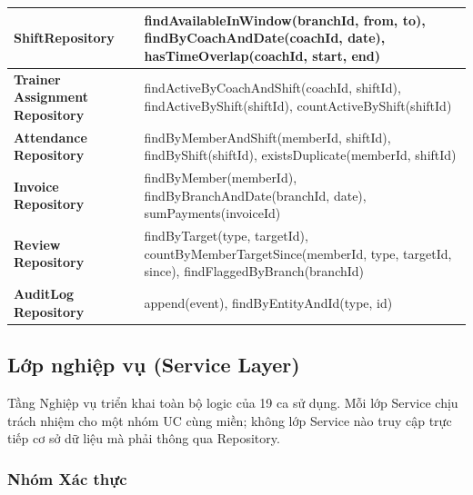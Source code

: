 \begin{longtable}{|>{\centering\arraybackslash}m{3.8cm}|>{\ttfamily\raggedright\arraybackslash}m{10.2cm}|}
\textbf{ShiftRepository} &
  findAvailableInWindow(branchId, from, to),
  findByCoachAndDate(coachId, date),
  hasTimeOverlap(coachId, start, end) \\ \hline

\textbf{Trainer Assignment Repository} &
  findActiveByCoachAndShift(coachId, shiftId),
  findActiveByShift(shiftId),
  countActiveByShift(shiftId) \\ \hline

\textbf{Attendance Repository} &
  findByMemberAndShift(memberId, shiftId),
  findByShift(shiftId),
  existsDuplicate(memberId, shiftId) \\ \hline

\textbf{Invoice Repository} &
  findByMember(memberId),
  findByBranchAndDate(branchId, date),
  sumPayments(invoiceId) \\ \hline

\textbf{Review Repository} &
  findByTarget(type, targetId),
  countByMemberTargetSince(memberId, type, targetId, since),
  findFlaggedByBranch(branchId) \\ \hline

\textbf{AuditLog Repository} &
  append(event),
  findByEntityAndId(type, id) \\ \hline

\end{longtable}
\endgroup

\newpage
\subsection{Lớp nghiệp vụ (Service Layer)}

Tầng Nghiệp vụ triển khai toàn bộ logic của 19 ca sử dụng. Mỗi lớp Service
chịu trách nhiệm cho một nhóm UC cùng miền; không lớp Service nào
truy cập trực tiếp cơ sở dữ liệu mà phải thông qua Repository.

\subsubsection*{Nhóm Xác thực}

